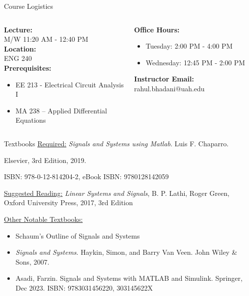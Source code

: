 \documentclass[aspectratio=169,xcolor=dvipsnames,svgnames,x11names,fleqn]{beamer}
\begin{document}

\begin{frame}{Course Logistics
}
  \begin{columns}[T] %
    \begin{column}{0.5\textwidth}
      \textbf{Lecture:} \\
      M/W 11:20 AM - 12:40 PM \\
      \vspace{0.3cm}
      \textbf{Location:} \\
      ENG 240 \\
      \vspace{0.3cm}
      \textbf{Prerequisites:}
      \begin{itemize}
        \item EE 213 - Electrical Circuit Analysis I
        \item MA 238 – Applied Differential Equations
      \end{itemize}
    \end{column}
    \begin{column}{0.5\textwidth}
      \textbf{Office Hours:}
      \begin{itemize}
        \item Tuesday: 2:00 PM - 4:00 PM
        \item Wednesday: 12:45 PM - 2:00 PM
      \end{itemize}
      \textbf{Instructor Email:} rahul.bhadani@uah.edu
    \end{column}
  \end{columns}
\end{frame}

\begin{frame}{Textbooks}
    \underline{Required:} \emph{\color{DarkGreen}Signals and Systems using Matlab}. Luis F. Chaparro. \par{\color{DarkRed}Elsevier, 3rd Edition, 2019}. \par ISBN: 978-0-12-814204-2, eBook ISBN: 9780128142059\par\vspace{5pt}

        \underline{Suggested Reading:} \textit{Linear Systems and Signals}, B. P. Lathi, Roger Green, Oxford University Press, 2017, 3rd Edition

        \underline{Other Notable Textbooks:}
        \begin{itemize}
            \item Schaum's Outline of Signals and Systems
            \item \textit{Signals and Systems}. Haykin, Simon, and Barry Van Veen. John Wiley \& Sons, 2007.
            \item Asadi, Farzin. Signals and Systems with MATLAB and Simulink. Springer, Dec 2023. ISBN: 9783031456220, 303145622X
        \end{itemize}
\end{frame}
\end{document}
